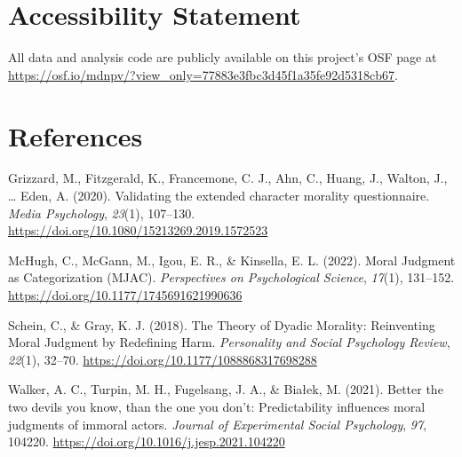 \documentclass[
  english,
  man,floatsintext]{apa7}
\begin{document}
\hypertarget{accessibility-statement}{%
\section{Accessibility Statement}\label{accessibility-statement}}

All data and analysis code are publicly available on this project's OSF page at \color{blue}\url{https://osf.io/mdnpv/?view_only=77883e3fbc3d45f1a35fe92d5318cb67}\color{black}.

\newpage

\hypertarget{references}{%
\section*{References}\label{references}}

\hypertarget{refs}{}
\leavevmode\hypertarget{ref-grizzard_validating_2020}{}%
Grizzard, M., Fitzgerald, K., Francemone, C. J., Ahn, C., Huang, J., Walton, J., \ldots{} Eden, A. (2020). Validating the extended character morality questionnaire. \emph{Media Psychology}, \emph{23}(1), 107--130. \url{https://doi.org/10.1080/15213269.2019.1572523}

\leavevmode\hypertarget{ref-mchugh_moral_2022}{}%
McHugh, C., McGann, M., Igou, E. R., \& Kinsella, E. L. (2022). Moral Judgment as Categorization (MJAC). \emph{Perspectives on Psychological Science}, \emph{17}(1), 131--152. \url{https://doi.org/10.1177/1745691621990636}

\leavevmode\hypertarget{ref-schein_theory_2018}{}%
Schein, C., \& Gray, K. J. (2018). The Theory of Dyadic Morality: Reinventing Moral Judgment by Redefining Harm. \emph{Personality and Social Psychology Review}, \emph{22}(1), 32--70. \url{https://doi.org/10.1177/1088868317698288}

\leavevmode\hypertarget{ref-walker_better_2021}{}%
Walker, A. C., Turpin, M. H., Fugelsang, J. A., \& Białek, M. (2021). Better the two devils you know, than the one you don't: Predictability influences moral judgments of immoral actors. \emph{Journal of Experimental Social Psychology}, \emph{97}, 104220. \url{https://doi.org/10.1016/j.jesp.2021.104220}
\end{document}
